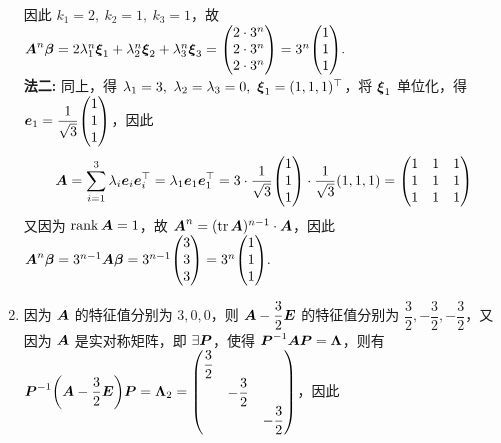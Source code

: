 \begin{solution}
\begin{enumerate}[label=(\arabic{*})]
              因此 $k_1=2,~k_2=1,~k_3=1$，故 $\vb*{A}^n\vb*{\beta}=2\lambda_1^n\vb*{\xi}_1+\lambda_2^n\vb*{\xi}_2+\lambda_3^n\vb*{\xi}_3=\mqty(2\cdot 3^n\\2\cdot 3^n\\2\cdot 3^n)=3^{n}\mqty(1\\1\\1).$\\
              \textbf{法二: }同上，得 $\lambda_1=3,~\lambda_2=\lambda_3=0,~\vb*{\xi}_1=(1,1,1)^\top$，将 $\vb*{\xi}_1$ 单位化，得 $\vb*{e}_1=\dfrac{1}{\sqrt{3}}\mqty(1\\1\\1)$，因此
              $$\vb*{A}=\sum_{i=1}^{3}\lambda_i\vb*{e}_i\vb*{e}_i^\top=\lambda_1\vb*{e}_1\vb*{e}_1^\top=3\cdot\dfrac{1}{\sqrt{3}}\mqty(1\\1\\1)\cdot\dfrac{1}{\sqrt{3}}(1,1,1)=\mqty(1&1&1\\1&1&1\\1&1&1)$$
              又因为 $\rank\vb*{A}=1$，故 $\vb*{A}^n=(\tr\vb*{A})^{n-1}\cdot\vb*{A}$，因此 $\vb*{A}^n\vb*{\beta}=3^{n-1}\vb*{A\beta}=3^{n-1}\mqty(3\\3\\3)=3^{n}\mqty(1\\1\\1).$
        \item 因为 $\vb*{A}$ 的特征值分别为 $3,0,0$，则 $\vb*{A}-\dfrac{3}{2}\vb*{E}$ 的特征值分别为 $\dfrac{3}{2},-\dfrac{3}{2},-\dfrac{3}{2}$，又因为 $\vb*{A}$ 是实对称矩阵，即 $\exists\vb*{P}$，使得 $\vb*{P}^{-1}\vb*{AP}=\vb*{\Lambda}$，则有
              $\vb*{P}^{-1}\qty(\vb*{A}-\dfrac{3}{2}\vb*{E})\vb*{P}=\vb*{\Lambda}_2=\mqty(\dfrac{3}{2}\\&-\dfrac{3}{2}\\&&-\dfrac{3}{2})$，因此
    \end{enumerate}
\end{solution}


